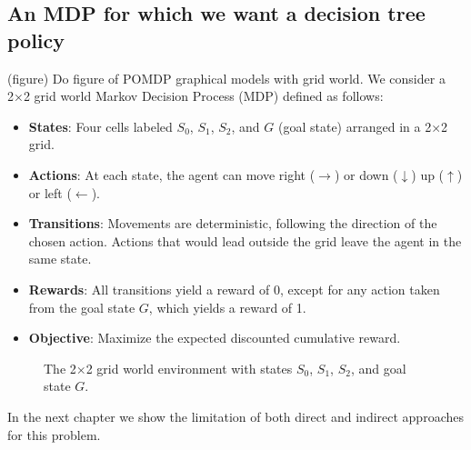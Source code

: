 \subsection{An MDP for which we want a decision tree policy}
(figure) Do figure of POMDP graphical models with grid world. 
We consider a 2×2 grid world Markov Decision Process (MDP) defined as follows:
\begin{itemize}
    \item \textbf{States}: Four cells labeled $S_0$, $S_1$, $S_2$, and $G$ (goal state) arranged in a 2×2 grid.
    \item \textbf{Actions}: At each state, the agent can move right ($\rightarrow$) or down ($\downarrow$) up ($\uparrow$) or left ($\leftarrow$).
    \item \textbf{Transitions}: Movements are deterministic, following the direction of the chosen action. Actions that would lead outside the grid leave the agent in the same state.
    \item \textbf{Rewards}: All transitions yield a reward of 0, except for any action taken from the goal state $G$, which yields a reward of 1.
    \item \textbf{Objective}: Maximize the expected discounted cumulative reward.
\end{itemize}
\begin{figure}[ht]
    \centering
    \caption{The 2×2 grid world environment with states $S_0$, $S_1$, $S_2$, and goal state $G$.}\label{fig:grid-world}
    \end{figure}
In the next chapter we show the limitation of both direct and indirect approaches for this problem.


